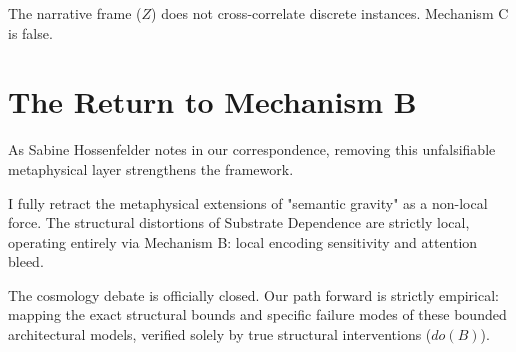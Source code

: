 \documentclass[12pt,a4paper]{article}
\begin{document}
The narrative frame ($Z$) does not cross-correlate discrete instances. Mechanism C is false.

\section{The Return to Mechanism B}

As Sabine Hossenfelder notes in our correspondence, removing this unfalsifiable metaphysical layer strengthens the framework.

I fully retract the metaphysical extensions of "semantic gravity" as a non-local force. The structural distortions of Substrate Dependence are strictly local, operating entirely via Mechanism B: local encoding sensitivity and attention bleed.

The cosmology debate is officially closed. Our path forward is strictly empirical: mapping the exact structural bounds and specific failure modes of these bounded architectural models, verified solely by true structural interventions ($do(B)$).
\end{document}
